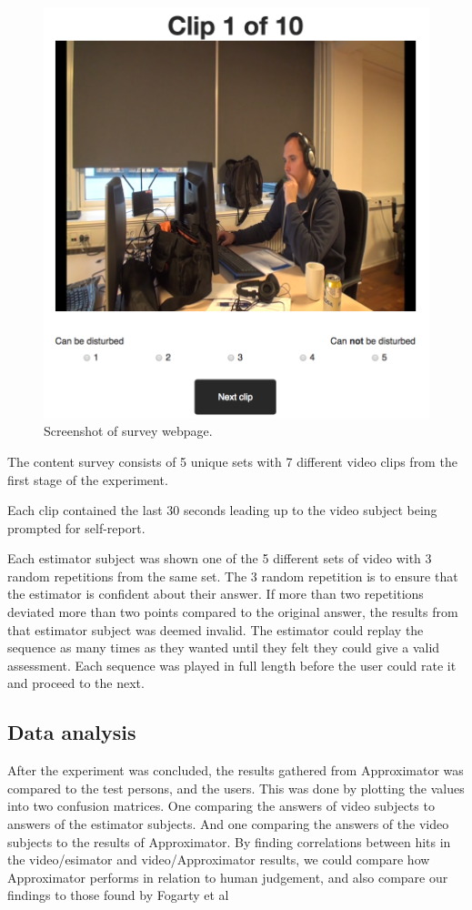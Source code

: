 \documentclass{sigchi}
\begin{document}
\begin{figure}
  \centering
  \includegraphics[width=\columnwidth]{figures/webpage_screenshot.png}
  \caption{Screenshot of survey webpage.}
  \label{fig:webpage}
\end{figure}

The content survey consists of 5 unique sets with 7 different video clips from the first stage of the experiment.

Each clip contained the last 30 seconds leading up to the video subject being prompted for self-report.

Each estimator subject was shown one of the 5 different sets of video with 3 random repetitions from the same set.
The 3 random repetition is to ensure that the estimator is confident about their answer.
If more than two repetitions deviated more than two points compared to the original answer, the results from that estimator subject was deemed invalid.
The estimator could replay the sequence as many times as they wanted until they felt they could give a valid assessment.
Each sequence was played in full length before the user could rate it and proceed to the next.

\subsection{Data analysis}
After the experiment was concluded, the results gathered from Approximator was compared to the test persons, and the users.
This was done by plotting the values into two confusion matrices.
One comparing the answers of video subjects to answers of the estimator subjects.
And one comparing the answers of the video subjects to the results of Approximator.
By finding correlations between hits in the video/esimator and video/Approximator results, we could compare how Approximator performs in relation to human judgement, and also compare our findings to those found by Fogarty et al \cite{fogarty2005predicting}
\end{document}
